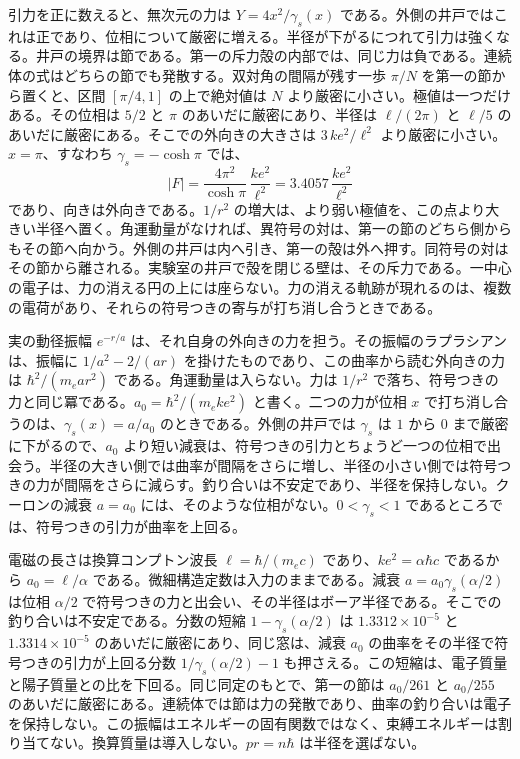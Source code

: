 \documentclass[a4paper]{article}
\begin{document}
引力を正に数えると、無次元の力は \(Y=4x^{2}/\gamma_s(x)\) である。外側の井戸ではこれは正であり、位相について厳密に増える。半径が下がるにつれて引力は強くなる。井戸の境界は節である。第一の斥力殻の内部では、同じ力は負である。連続体の式はどちらの節でも発散する。双対角の間隔が残す一歩 \(\pi/N\) を第一の節から置くと、区間 \([\pi/4,1]\) の上で絶対値は \(N\) より厳密に小さい。極値は一つだけある。その位相は \(5/2\) と \(\pi\) のあいだに厳密にあり、半径は \(\ell/(2\pi)\) と \(\ell/5\) のあいだに厳密にある。そこでの外向きの大きさは \(3\,k e^{2}/\ell^{2}\) より厳密に小さい。\(x=\pi\)、すなわち \(\gamma_s=-\cosh\pi\) では、
\begin{equation}
\label{eq:plateau}
\bigl|F\bigr|
  =\frac{4\pi^{2}}{\cosh\pi}\,\frac{k e^{2}}{\ell^{2}}
  =3.4057\,\frac{k e^{2}}{\ell^{2}}
\end{equation}
であり、向きは外向きである。\(1/r^{2}\) の増大は、より弱い極値を、この点より大きい半径へ置く。角運動量がなければ、異符号の対は、第一の節のどちら側からもその節へ向かう。外側の井戸は内へ引き、第一の殻は外へ押す。同符号の対はその節から離される。実験室の井戸で殻を閉じる壁は、その斥力である。一中心の電子は、力の消える円の上には座らない。力の消える軌跡が現れるのは、複数の電荷があり、それらの符号つきの寄与が打ち消し合うときである。

実の動径振幅 \(e^{-r/a}\) は、それ自身の外向きの力を担う。その振幅のラプラシアンは、振幅に \(1/a^{2}-2/(ar)\) を掛けたものであり、この曲率から読む外向きの力は \(\hbar^{2}/(m_e a r^{2})\) である。角運動量は入らない。力は \(1/r^{2}\) で落ち、符号つきの力と同じ冪である。\(a_0=\hbar^{2}/(m_e k e^{2})\) と書く。二つの力が位相 \(x\) で打ち消し合うのは、\(\gamma_s(x)=a/a_0\) のときである。外側の井戸では \(\gamma_s\) は \(1\) から \(0\) まで厳密に下がるので、\(a_0\) より短い減衰は、符号つきの引力とちょうど一つの位相で出会う。半径の大きい側では曲率が間隔をさらに増し、半径の小さい側では符号つきの力が間隔をさらに減らす。釣り合いは不安定であり、半径を保持しない。クーロンの減衰 \(a=a_0\) には、そのような位相がない。\(0<\gamma_s<1\) であるところでは、符号つきの引力が曲率を上回る。

電磁の長さは換算コンプトン波長 \(\ell=\hbar/(m_e c)\) であり、\(k e^{2}=\alpha\hbar c\) であるから \(a_0=\ell/\alpha\) である。微細構造定数は入力のままである。減衰 \(a=a_0\gamma_s(\alpha/2)\) は位相 \(\alpha/2\) で符号つきの力と出会い、その半径はボーア半径である。そこでの釣り合いは不安定である。分数の短縮 \(1-\gamma_s(\alpha/2)\) は \(1.3312\times 10^{-5}\) と \(1.3314\times 10^{-5}\) のあいだに厳密にあり、同じ窓は、減衰 \(a_0\) の曲率をその半径で符号つきの引力が上回る分数 \(1/\gamma_s(\alpha/2)-1\) も押さえる。この短縮は、電子質量と陽子質量との比を下回る。同じ同定のもとで、第一の節は \(a_0/261\) と \(a_0/255\) のあいだに厳密にある。連続体では節は力の発散であり、曲率の釣り合いは電子を保持しない。この振幅はエネルギーの固有関数ではなく、束縛エネルギーは割り当てない。換算質量は導入しない。\(pr=n\hbar\) は半径を選ばない。
\end{document}
